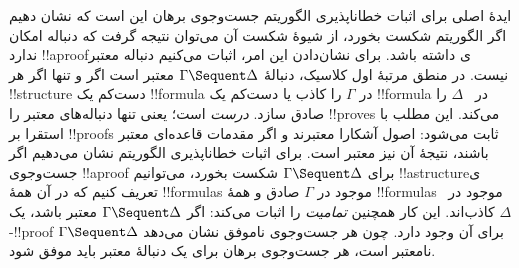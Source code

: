 \documentclass[../../../include/open-logic-section]{subfiles}
\begin{document}
ایدهٔ اصلی برای اثبات خطاناپذیری الگوریتم جست‌وجوی برهان این است که
نشان دهیم اگر الگوریتم شکست بخورد، از شیوهٔ شکست آن می‌توان نتیجه گرفت
که دنباله امکان ندارد !!a{proof}ی داشته باشد. برای نشان‌دادن این امر،
اثبات می‌کنیم دنباله معتبر نیست. در منطق مرتبهٔ اول کلاسیک، دنبالهٔ
$\Gamma \Sequent \Delta$ معتبر است اگر و تنها اگر هر !!{structure} دست‌کم
یک !!{formula} در $\Gamma$ را کاذب یا دست‌کم یک !!{formula} در
~$\Delta$ را صادق سازد.  \emph{درست} است؛ یعنی تنها
دنباله‌های معتبر را !!{prove}s می‌کند. این مطلب با استقرا بر
!!{proof}s ثابت می‌شود: اصول آشکارا معتبرند و اگر مقدمات قاعده‌ای
معتبر باشند، نتیجهٔ آن نیز معتبر است. برای اثبات خطاناپذیری الگوریتم
نشان می‌دهیم اگر جست‌وجوی !!a{proof} برای
$\Gamma \Sequent \Delta$ شکست بخورد، می‌توانیم !!a{structure}ی تعریف
کنیم که در آن همهٔ !!{formula}s موجود در $\Gamma$ صادق و همهٔ
!!{formula}s موجود در~$\Delta$ کاذب‌اند. این کار همچنین \emph{تمامیت}
 را اثبات می‌کند: اگر $\Gamma \Sequent \Delta$ معتبر باشد،
یک -!!{proof} برای آن وجود دارد. چون هر جست‌وجوی ناموفق نشان
می‌دهد $\Gamma \Sequent \Delta$ نامعتبر است، هر جست‌وجوی برهان برای
یک دنبالهٔ معتبر باید موفق شود.
\end{document}
